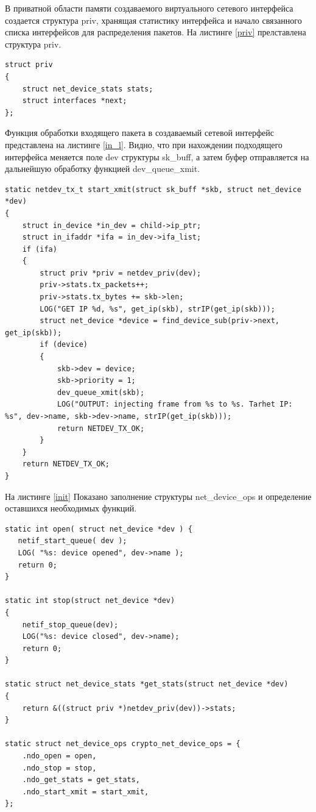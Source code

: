 \documentclass[14pt, a4paper]{extarticle}
\begin{document}
В приватной области памяти создаваемого виртуального сетевого интерфейса создается структура priv, хранящая статистику интерфейса и начало связанного списка интерфейсов для распределения пакетов. На листинге \ref{priv} прелставлена структура priv.
\begin{lstlisting}[caption=Структура приватной области интерфейса, label=priv]
struct priv
{
    struct net_device_stats stats;
    struct interfaces *next;
};
\end{lstlisting}

Функция обработки входящего пакета в создаваемый сетевой интерфейс представлена на листинге \ref{in_l}. Видно, что при нахождении подходящего интерфейса меняется поле dev структуры sk\_buff, а затем буфер отправляется на дальнейшую обработку функцией dev\_queue\_xmit.
\begin{lstlisting}[caption=start\_xmit, label=in_l]
static netdev_tx_t start_xmit(struct sk_buff *skb, struct net_device *dev)
{
    struct in_device *in_dev = child->ip_ptr;
    struct in_ifaddr *ifa = in_dev->ifa_list;
    if (ifa) 
    {
        struct priv *priv = netdev_priv(dev);
        priv->stats.tx_packets++;
        priv->stats.tx_bytes += skb->len;
        LOG("GET IP %d, %s", get_ip(skb), strIP(get_ip(skb)));
        struct net_device *device = find_device_sub(priv->next, get_ip(skb));
        if (device)
        {
            skb->dev = device;
            skb->priority = 1;
            dev_queue_xmit(skb);
            LOG("OUTPUT: injecting frame from %s to %s. Tarhet IP: %s", dev->name, skb->dev->name, strIP(get_ip(skb)));
            return NETDEV_TX_OK;
        }
    }
    return NETDEV_TX_OK;
}
\end{lstlisting}

На листинге \ref{init} Показано заполнение структуры net\_device\_ops и определение оставшихся необходимых функций.

\begin{lstlisting}[caption=net\_device\_ops, label=init]
static int open( struct net_device *dev ) {
   netif_start_queue( dev );
   LOG( "%s: device opened", dev->name );
   return 0;
}

static int stop(struct net_device *dev)
{
    netif_stop_queue(dev);
    LOG("%s: device closed", dev->name);
    return 0;
}

static struct net_device_stats *get_stats(struct net_device *dev)
{
    return &((struct priv *)netdev_priv(dev))->stats;
}

static struct net_device_ops crypto_net_device_ops = {
    .ndo_open = open,
    .ndo_stop = stop,
    .ndo_get_stats = get_stats,
    .ndo_start_xmit = start_xmit,
};
\end{lstlisting}
\end{document}
